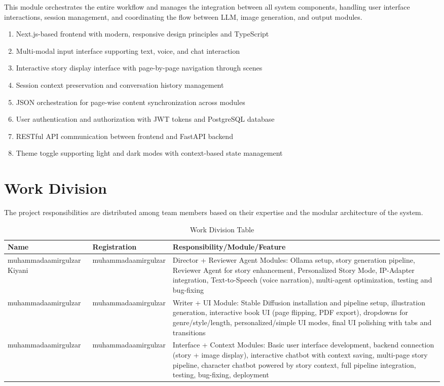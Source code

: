 This module orchestrates the entire workflow and manages the integration between all system components, handling user interface interactions, session management, and coordinating the flow between LLM, image generation, and output modules.

\begin{enumerate}
    \item Next.js-based frontend with modern, responsive design principles and TypeScript
    \item Multi-modal input interface supporting text, voice, and chat interaction
    \item Interactive story display interface with page-by-page navigation through scenes
    \item Session context preservation and conversation history management
    \item JSON orchestration for page-wise content synchronization across modules
    \item User authentication and authorization with JWT tokens and PostgreSQL database
    \item RESTful API communication between frontend and FastAPI backend
    \item Theme toggle supporting light and dark modes with context-based state management
\end{enumerate}

\section{Work Division}

The project responsibilities are distributed among team members based on their expertise and the modular architecture of the system.

\begin{table}[H]
\centering
\caption{Work Division Table}
\begin{tabular}{|p{4cm}|p{2.5cm}|p{8cm}|}
\hline
\textbf{Name} & \textbf{Registration} & \textbf{Responsibility/Module/Feature} \\ \hline
muhammadaamirgulzar Kiyani & muhammadaamirgulzar & Director + Reviewer Agent Modules: Ollama setup, story generation pipeline, Reviewer Agent for story enhancement, Personalized Story Mode, IP-Adapter integration, Text-to-Speech (voice narration), multi-agent optimization, testing and bug-fixing \\ \hline
muhammadaamirgulzar & muhammadaamirgulzar & Writer + UI Module: Stable Diffusion installation and pipeline setup, illustration generation, interactive book UI (page flipping, PDF export), dropdowns for genre/style/length, personalized/simple UI modes, final UI polishing with tabs and transitions \\ \hline
muhammadaamirgulzar & muhammadaamirgulzar & Interface + Context Modules: Basic user interface development, backend connection (story + image display), interactive chatbot with context saving, multi-page story pipeline, character chatbot powered by story context, full pipeline integration, testing, bug-fixing, deployment \\ \hline
\end{tabular}
\label{tab:work_division}
\end{table}

